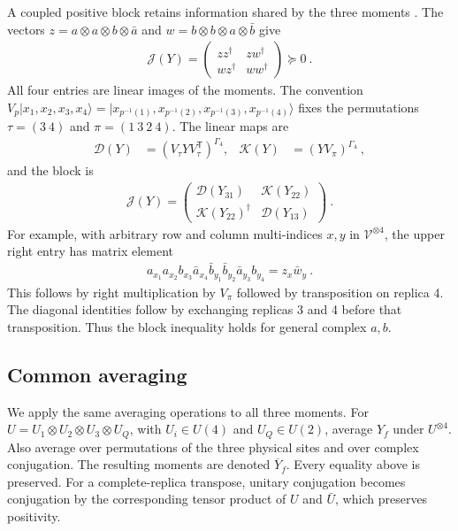 \documentclass[aps,pra,reprint,superscriptaddress,amsmath,amssymb,floatfix,nofootinbib]{revtex4-2}
\begin{document}
A coupled positive block retains information shared by the three moments
\cite{Candidate}. The vectors
$z=a\otimes a\otimes b\otimes\bar a$ and
$w=b\otimes b\otimes a\otimes\bar b$ give
\begin{align}
 \mathcal J(Y)=
 \begin{pmatrix}zz^\dagger&zw^\dagger\\wz^\dagger&ww^\dagger\end{pmatrix}
 \succeq0\ .
 \label{eq:matched-joint}
\end{align}
All four entries are linear images of the moments.
The convention
$V_p|x_1,x_2,x_3,x_4\rangle
=|x_{p^{-1}(1)},x_{p^{-1}(2)},x_{p^{-1}(3)},x_{p^{-1}(4)}\rangle$
fixes the permutations $\tau=(3\ 4)$ and $\pi=(1\ 3\ 2\ 4)$.
The linear maps are
\begin{align}
 \mathcal D(Y)&=(V_\tau YV_\tau^{\mathsf T})^{\Gamma_4},
 &\mathcal K(Y)&=(YV_\pi)^{\Gamma_4}\ ,
 \label{eq:joint-maps}
\end{align}
and the block is
\begin{align}
 \mathcal J(Y)=
 \begin{pmatrix}
 \mathcal D(Y_{31})&\mathcal K(Y_{22})\\
 \mathcal K(Y_{22})^\dagger&\mathcal D(Y_{13})
 \end{pmatrix}\ .
 \label{eq:joint-linear}
\end{align}
For example, with arbitrary row and column multi-indices $x,y$ in
$\mathcal V^{\otimes4}$, the upper right entry has matrix element
\begin{align}
 a_{x_1}a_{x_2}b_{x_3}\bar a_{x_4}
 \bar b_{y_1}\bar b_{y_2}\bar a_{y_3}b_{y_4}
 =z_x\bar w_y\ .
 \label{eq:joint-cross-indices}
\end{align}
This follows by right multiplication by $V_\pi$ followed by transposition
on replica 4. The diagonal identities follow by exchanging replicas 3
and 4 before that transposition.
Thus the block inequality holds for general complex $a,b$.

\subsection{Common averaging}

We apply the same averaging operations to all three moments.
For $U=U_1\otimes U_2\otimes U_3\otimes U_Q$, with $U_i\in U(4)$
and $U_Q\in U(2)$, average $Y_f$ under $U^{\otimes4}$.
Also average over permutations of the three physical sites and over
complex conjugation. The resulting moments are denoted $\overline Y_f$.
Every equality above is preserved. For a complete-replica transpose,
unitary conjugation becomes conjugation by the corresponding tensor
product of $U$ and $\bar U$, which preserves positivity.
\end{document}
